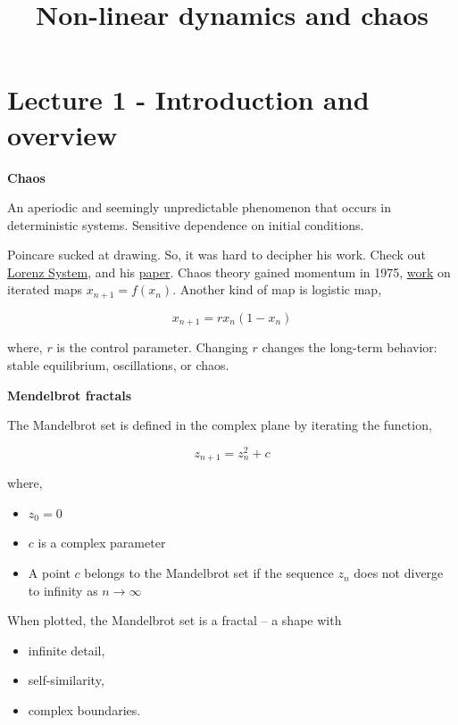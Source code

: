 

\title{Non-linear dynamics and chaos}
\date{}


\maketitle

\section{Lecture 1 - Introduction and overview}
\textbf{Chaos}

An aperiodic and seemingly unpredictable phenomenon that occurs in
deterministic systems. Sensitive dependence on initial conditions.

Poincare sucked at drawing. So, it was hard to decipher his work.
Check out \href{https://en.wikipedia.org/wiki/Lorenz_system}{Lorenz System},
and his \href{./resource/atsc-1520-0469_1963_020_0130_dnf_2_0_co_2.pdf}{paper}. Chaos
theory gained momentum in 1975, \href{https://doi.org/10.1038/261459a0}{work} on iterated
maps $x_{n+1} = f(x_n)$. Another kind of map is logistic map,

\[
    x_{n+1} = r x_n (1 - x_n)
\]

where, $r$ is the control parameter. Changing $r$ changes the long-term behavior: stable equilibrium, oscillations, or
chaos.

\textbf{Mendelbrot fractals}

The Mandelbrot set is defined in the complex plane by iterating the function,

\[
    z_{n+1} = z_n^2 + c    
\]

where,
\begin{itemize}
    \item $z_0 = 0$
    \item $c$ is a complex parameter
    \item A point $c$ belongs to the Mandelbrot set if the sequence $z_n$
        does not diverge to infinity as $n \rightarrow \infty$
\end{itemize}

When plotted, the Mandelbrot set is a fractal -- a shape with

\begin{itemize}
    \item infinite detail,
    \item self-similarity,
    \item complex boundaries.
\end{itemize}

